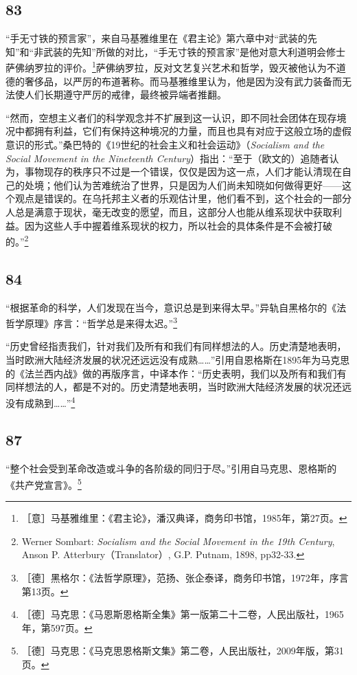 \documentclass[fontset=fandol, a4paper, 12pt, openright]{ctexbook}
\begin{document}
\subsection*{83}
“手无寸铁的预言家”，来自马基雅维里在《君主论》第六章中对“武装的先知”和“非武装的先知”所做的对比，“手无寸铁的预言家”是他对意大利道明会修士萨佛纳罗拉的评价。\footnote{［意］马基雅维里：《君主论》，潘汉典译，商务印书馆，1985年，第27页。}萨佛纳罗拉，反对文艺复兴艺术和哲学，毁灭被他认为不道德的奢侈品，以严厉的布道著称。而马基雅维里认为，他是因为没有武力装备而无法使人们长期遵守严厉的戒律，最终被异端者推翻。

“然而，空想主义者们的科学观念并不扩展到这一认识，即不同社会团体在现存境况中都拥有利益，它们有保持这种境况的力量，而且也具有对应于这般立场的虚假意识的形式。”桑巴特的《19世纪的社会主义和社会运动》（\textit{Socialism and the Social Movement in the Nineteenth Century}）指出：“至于（欧文的）追随者认为，事物现存的秩序只不过是一个错误，仅仅是因为这一点，人们才能认清现在自己的处境；他们认为苦难统治了世界，只是因为人们尚未知晓如何做得更好——这个观点是错误的。在乌托邦主义者的乐观估计里，他们看不到，这个社会的一部分人总是满意于现状，毫无改变的愿望，而且，这部分人也能从维系现状中获取利益。因为这些人手中握着维系现状的权力，所以社会的具体条件是不会被打破的。”\footnote{Werner Sombart: \textit{Socialism and the Social Movement in the 19th Century}, Anson P. Atterbury（Translator）, G.P. Putnam, 1898, pp32-33.}

\subsection*{84}
“根据革命的科学，人们发现在当今，意识总是到来得太早。”异轨自黑格尔的《法哲学原理》序言：“哲学总是来得太迟。”\footnote{［德］黑格尔：《法哲学原理》，范扬、张企泰译，商务印书馆，1972年，序言第13页。}

“历史曾经指责我们，针对我们及所有和我们有同样想法的人。历史清楚地表明，当时欧洲大陆经济发展的状况还远远没有成熟……”引用自恩格斯在1895年为马克思的《法兰西内战》做的再版序言，中译本作：“历史表明，我们以及所有和我们有同样想法的人，都是不对的。历史清楚地表明，当时欧洲大陆经济发展的状况还远没有成熟到……”\footnote{［德］马克思：《马恩斯恩格斯全集》第一版第二十二卷，人民出版社，1965年，第597页。}

\subsection*{87}
“整个社会受到革命改造或斗争的各阶级的同归于尽。”引用自马克思、恩格斯的《共产党宣言》。\footnote{［德］马克思：《马克思恩格斯文集》第二卷，人民出版社，2009年版，第31页。}
\end{document}
